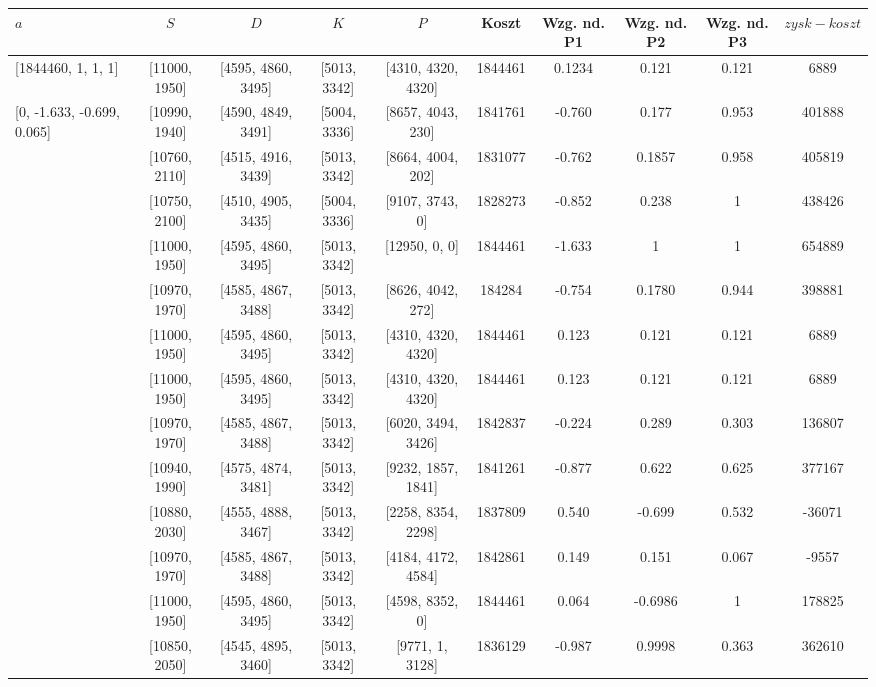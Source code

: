 \documentclass[a4paper, 10pt]{article}
\begin{document}
\begin{landscape}
\begin{center}
\begin{tabular}{ | l | c | c | c | c | c | c | c | c |c |}
    $a$ & $S$ & $D$ & $K$ & $P$ & \textcolor{orange!80}{Koszt} & \textcolor{orange!80}{Wzg. nd. P1}  & \textcolor{orange!80}{Wzg. nd. P2} & \textcolor{orange!80}{Wzg. nd. P3} & $zysk-koszt$ \\ \hline	 
	 \textcolor{red!70}{[1844460, 1, 1, 1]} &  [11000, 1950] & [4595, 4860, 3495] & [5013, 3342] & [4310, 4320, 4320] & 1844461 & 0.1234  & 0.121  & 0.121  & 6889 \\  \hline
	 \textcolor{green!80}{[0, -1.633, -0.699, 0.065]} &  [10990, 1940] & [4590, 4849, 3491] & [5004, 3336] & [8657, 4043, 230] & 1841761 & -0.760  & 0.177  & 0.953  & 401888 \\  \hline
	 [1800000, -1.633, -0.699, 0.065] &  [10760, 2110] & [4515, 4916, 3439] & [5013, 3342] & [8664, 4004, 202] & 1831077 & -0.762  & 0.1857  & 0.958  & 405819 \\  \hline
	 [1800000, -2, -0.699, 0.065] &  [10750, 2100] & [4510, 4905, 3435] & [5004, 3336] & [9107, 3743, 0] & \textcolor{blue!80}{1828273} & -0.852  & 0.238  & 1  & 438426 \\  \hline
	 [1800000, -3, -0.699, 0.065] &  [11000, 1950] & [4595, 4860, 3495] & [5013, 3342] & [12950, 0, 0] & 1844461 & \textcolor{blue!80}{ -1.633}  & 1  & 1  & \textcolor{blue!80}{654889} \\  \hline
	 [1500000, -1.633, -0.699, 0.065] &  [10970, 1970] & [4585, 4867, 3488] & [5013, 3342] & [8626, 4042, 272] & 184284 & -0.754  & 0.1780  & 0.944  & 398881 \\  \hline
	 [1500000, -1, -1, -1] &  [11000, 1950] & [4595, 4860, 3495] & [5013, 3342] & [4310, 4320, 4320] & 1844461 & 0.123  & 0.121  & 0.121  & 6889\\ \hline
	 [1800000, 0, 0, 0] &  [11000, 1950] & [4595, 4860, 3495] & [5013, 3342] & [4310, 4320, 4320] & 1844461 & 0.123  & 0.121  & 0.121  & 6889 \\ \hline
	 [1800000, 0, 0.5, 0.5] &  [10970, 1970] & [4585, 4867, 3488] & [5013, 3342] & [6020, 3494, 3426] & 1842837 & -0.224  & 0.289  & 0.303  & 136807 \\ \hline
	 [1000000, -1, 0.5, 0.5] &  [10940, 1990] & [4575, 4874, 3481] & [5013, 3342] & [9232, 1857, 1841] & 1841261 & -0.877  & 0.622  & 0.625  & 377167 \\ \hline
	 [1000000, 0.5, -1, 0.5] &  [10880, 2030] & [4555, 4888, 3467] & [5013, 3342] & [2258, 8354, 2298] & 1837809 & 0.540  & \textcolor{blue!80}{ -0.699}  & 0.532  & -36071 \\ \hline
	 [1000000, 0.5, 0.5, -1] &  [10970, 1970] & [4585, 4867, 3488] & [5013, 3342] & [4184, 4172, 4584] & 1842861 & 0.149  & 0.151  & \textcolor{blue!80}{0.067}  & -9557\\ \hline
	 [1000000, -1, -1, 1] &  [11000, 1950] & [4595, 4860, 3495] & [5013, 3342] & [4598, 8352, 0] & 1844461 & 0.064  & -0.6986  & 1  & 178825 \\ \hline
	 [1000000, -2, 0, -1] &  [10850, 2050] & [4545, 4895, 3460] & [5013, 3342] & [9771, 1, 3128] & 1836129 & -0.987  & 0.9998  & 0.363 & 362610 \\ \hline
	 

\end{tabular}
\end{center}
\end{landscape}
\end{document}
